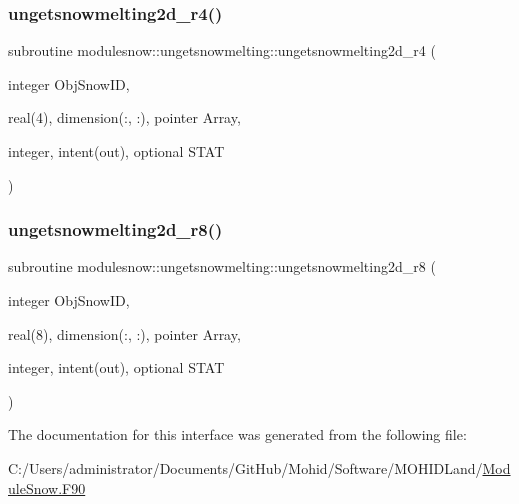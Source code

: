 \subsubsection{\texorpdfstring{ungetsnowmelting2d\+\_\+r4()}{ungetsnowmelting2d\_r4()}}
{\footnotesize\ttfamily subroutine modulesnow\+::ungetsnowmelting\+::ungetsnowmelting2d\+\_\+r4 (\begin{DoxyParamCaption}\item[{integer}]{Obj\+Snow\+ID,  }\item[{real(4), dimension(\+:, \+:), pointer}]{Array,  }\item[{integer, intent(out), optional}]{S\+T\+AT }\end{DoxyParamCaption})\hspace{0.3cm}{\ttfamily [private]}}

\mbox{\label{interfacemodulesnow_1_1ungetsnowmelting_ae7674e5a6a085c0e73335197a78b010d}} 
\subsubsection{\texorpdfstring{ungetsnowmelting2d\+\_\+r8()}{ungetsnowmelting2d\_r8()}}
{\footnotesize\ttfamily subroutine modulesnow\+::ungetsnowmelting\+::ungetsnowmelting2d\+\_\+r8 (\begin{DoxyParamCaption}\item[{integer}]{Obj\+Snow\+ID,  }\item[{real(8), dimension(\+:, \+:), pointer}]{Array,  }\item[{integer, intent(out), optional}]{S\+T\+AT }\end{DoxyParamCaption})\hspace{0.3cm}{\ttfamily [private]}}



The documentation for this interface was generated from the following file\+:\begin{DoxyCompactItemize}
\item 
C\+:/\+Users/administrator/\+Documents/\+Git\+Hub/\+Mohid/\+Software/\+M\+O\+H\+I\+D\+Land/\mbox{\hyperlink{_module_snow_8_f90}{Module\+Snow.\+F90}}\end{DoxyCompactItemize}
